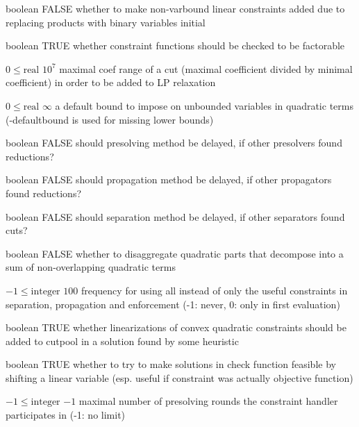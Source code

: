 %
{boolean}%
{FALSE}%
{whether to make non-varbound linear constraints added due to replacing products with binary variables initial}%
{}

%
{boolean}%
{TRUE}%
{whether constraint functions should be checked to be factorable}%
{}

%
{$0\leq\textrm{real}$}%
{$10^{  7}$}%
{maximal coef range of a cut (maximal coefficient divided by minimal coefficient) in order to be added to LP relaxation}%
{}

%
{$0\leq\textrm{real}$}%
{$\infty$}%
{a default bound to impose on unbounded variables in quadratic terms (-defaultbound is used for missing lower bounds)}%
{}

%
{boolean}%
{FALSE}%
{should presolving method be delayed, if other presolvers found reductions?}%
{}

%
{boolean}%
{FALSE}%
{should propagation method be delayed, if other propagators found reductions?}%
{}

%
{boolean}%
{FALSE}%
{should separation method be delayed, if other separators found cuts?}%
{}

%
{boolean}%
{FALSE}%
{whether to disaggregate quadratic parts that decompose into a sum of non-overlapping quadratic terms}%
{}

%
{$-1\leq\textrm{integer}$}%
{$100$}%
{frequency for using all instead of only the useful constraints in separation, propagation and enforcement (-1: never, 0: only in first evaluation)}%
{}

%
{boolean}%
{TRUE}%
{whether linearizations of convex quadratic constraints should be added to cutpool in a solution found by some heuristic}%
{}

%
{boolean}%
{TRUE}%
{whether to try to make solutions in check function feasible by shifting a linear variable (esp. useful if constraint was actually objective function)}%
{}

%
{$-1\leq\textrm{integer}$}%
{$-1$}%
{maximal number of presolving rounds the constraint handler participates in (-1: no limit)}%
{}

